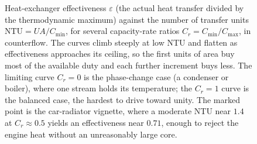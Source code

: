 \begin{figure}[htbp]
\centering
{}
\caption[Effectiveness versus NTU for a counterflow exchanger]{Heat-exchanger
effectiveness $\varepsilon$ (the actual heat transfer divided by the
thermodynamic maximum) against the number of transfer units
$\text{NTU}=UA/C_{\min}$, for several capacity-rate ratios
$C_r=C_{\min}/C_{\max}$, in counterflow. The curves climb steeply at low NTU and
flatten as effectiveness approaches its ceiling, so the first units of area buy
most of the available duty and each further increment buys less. The
limiting curve $C_r=0$ is the phase-change case (a condenser or boiler), where
one stream holds its temperature; the $C_r=1$ curve is the balanced case, the
hardest to drive toward unity. The marked point is the car-radiator vignette,
where a moderate NTU near $1.4$ at $C_r\approx 0.5$ yields an effectiveness near
$0.71$, enough to reject the engine heat without an unreasonably large core.}
\label{fig:vol04ch05:effectiveness-ntu}
\end{figure}
